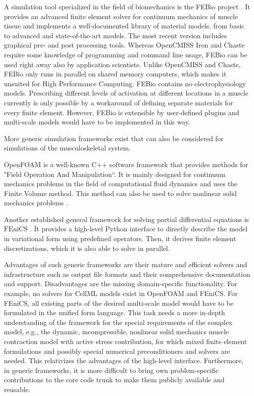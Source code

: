 A simulation tool specialized in the field of biomechanics is the FEBio project \cite{Maas2012,maas2017febio}. It provides an advanced finite element solver for continuum mechanics of muscle tissue and implements a well-documented library of material models, from basic to advanced and state-of-the-art models. The most recent version includes graphical pre- and post processing tools. Whereas OpenCMISS Iron and Chaste require some knowledge of programming and command line usage, FEBio can be used right away also by application scientists. 
Unlike OpenCMISS and Chaste, FEBio only runs in parallel on shared memory computers, which makes it unsuited for High Performance Computing. FEBio contains no electrophysiology models. Prescribing different levels of activation at different locations in a muscle currently is only possible by a workaround of defining separate materials for every finite element. However, FEBio is extensible by user-defined plugins and multi-scale models would have to be implemented in this way.

More generic simulation frameworks exist that can also be considered for simulations of the musculoskeletal system.

OpenFOAM \cite{jasak2007openfoam} is a well-known C++ software framework that provides methods for "Field Operation And Manipulation``. It is mainly designed for continuum mechanics problems in the field of computational fluid dynamics and uses the Finite Volume method. This method can also be used to solve nonlinear solid mechanics problems \cite{cardiff2014nonlinear}.

Another established general framework for solving partial differential equations is $\text{FEniCS}$ \cite{alnaes2015fenics}. It provides a high-level Python interface to directly describe the model in variational form using predefined operators. Then, it derives finite element discretizations, which it is also able to solve in parallel.

Advantages of such generic frameworks are their mature and efficient solvers and infrastructure such as output file formats and their comprehensive documentation and support. Disadvantages are the missing domain-specific functionality. For example, no solvers for CellML models exist in OpenFOAM and FEniCS. For FEniCS, all existing parts of the desired multi-scale model would have to be formulated in the unified form language. This task needs a more in-depth understanding of the framework for the special requirements of the complex model, e.g., the dynamic, incompressible, nonlinear solid mechanics muscle contraction model with active stress contribution, for which mixed finite element formulations and possibly special numerical preconditioners and solvers are needed. This relativizes the advantages of the high-level interface.
Furthermore, in generic frameworks, it is more difficult to bring own problem-specific contributions to the core code trunk to make them publicly available and reusable.

